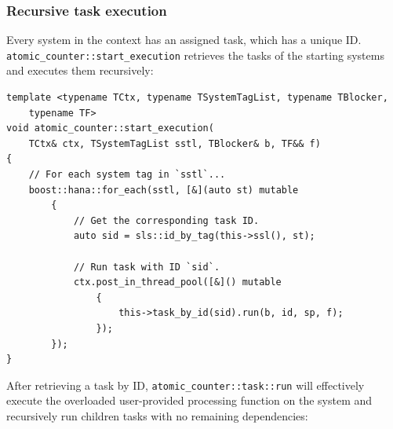 \documentclass[twoside, 12pt, a4paper, openright]{book}
\begin{document}
\hypertarget{multithreading_recursive_task_execution}{\subsubsection{Recursive
task execution}\label{multithreading_recursive_task_execution}}

Every system in the context has an assigned task, which has a unique ID.
\texttt{atomic_counter::start_execution}
retrieves the tasks of the starting systems and executes them
recursively:

\begin{verbatim}
template <typename TCtx, typename TSystemTagList, typename TBlocker,
    typename TF>
void atomic_counter::start_execution(
    TCtx& ctx, TSystemTagList sstl, TBlocker& b, TF&& f)
{
    // For each system tag in `sstl`...
    boost::hana::for_each(sstl, [&](auto st) mutable
        {
            // Get the corresponding task ID.
            auto sid = sls::id_by_tag(this->ssl(), st);

            // Run task with ID `sid`.
            ctx.post_in_thread_pool([&]() mutable
                {
                    this->task_by_id(sid).run(b, id, sp, f);
                });
        });
}
\end{verbatim}

After retrieving a task by ID,
\texttt{atomic_counter::task::run}
will effectively execute the overloaded user-provided processing
function on the system and recursively run children tasks with no
remaining dependencies:
\end{document}
